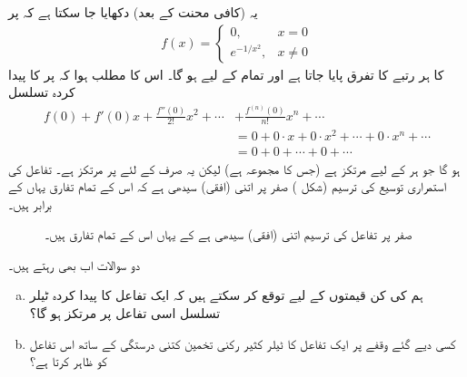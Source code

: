\quad {}

یہ (کافی محنت کے بعد) دکھایا جا سکتا ہے کہ  پر
 \begin{align*}
f(x)=
\begin{cases}
0,&x=0\\
e^{-1/x^2},&x\ne 0
\end{cases}
\end{align*}
کا ہر رتبے کا تفرق پایا جاتا ہے اور تمام  کے لیے  ہو  گا۔ اس کا مطلب ہوا کہ  پر  کا پیدا کردہ تسلسل
\begin{align*}
f(0)+f'(0)x+\frac{f''(0)}{2!}x^2+\cdots &+\frac{f^{(n)}(0)}{n!}x^n+\cdots\\
&=0+0\cdot x+0\cdot x^2+\cdots+0\cdot x^n+\cdots\\
&=0+0+\cdots+0+\cdots
\end{align*}
ہو گا جو ہر  کے لیے مرتکز ہے (جس کا مجموعہ  ہے) لیکن یہ صرف   کے لئے  پر مرتکز ہے۔  تفاعل  کی استمراری توسیع کی ترسیم (شکل ) صفر پر اتنی (افقی) سیدھی  ہے کہ اس کے تمام تفارق یہاں  کے برابر ہیں۔
\begin{figure}
\centering
{}
\caption{صفر پر تفاعل کی ترسیم اتنی (افقی) سیدھی ہے  کے یہاں اس کے تمام تفارق  ہیں۔}
\label{شکل_مثال_تسلسل_مرکوز_لیکن_تفاعل_کو_نہیں}
\end{figure}


دو سوالات اب بھی رہتے ہیں۔
\begin{enumerate}[a.]
\item
ہم  کی کن قیمتوں کے لیے توقع کر سکتے ہیں کہ ایک تفاعل کا پیدا کردہ ٹیلر تسلسل اسی تفاعل پر مرتکز ہو گا؟
\item
کسی دیے گئے وقفے  پر ایک تفاعل  کا ٹیلر کثیر رکنی تخمین کتنی درستگی کے ساتھ اس تفاعل کو ظاہر کرتا ہے؟
\end{enumerate} 


